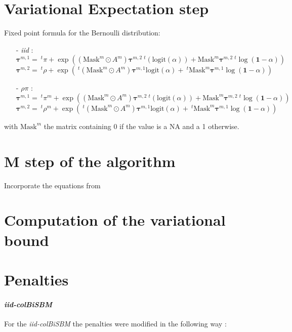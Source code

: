 \documentclass[12pt,a4paper]{report}
\begin{document}
\section{Variational Expectation step}
Fixed point formula for the Bernoulli distribution:
\begin{itemize}
    \item[-] \textit{iid} :
    \[ \bm{\tau}^{m,1} = ~^{t}\pi + \exp((\text{Mask}^{m} \odot A^{m})
        \bm{\tau}^{m,2} ~^{t}(\text{logit}(\alpha)) + \text{Mask}^{m} 
        \bm{\tau}^{m,2} ~^{t}\log(\bm{1} - \alpha)) \]
    \[ \bm{\tau}^{m,2} = ~^{t}\rho + \exp(~^{t}(\text{Mask}^{m} \odot A^{m}) 
    \bm{\tau}^{m,1} \text{logit}(\alpha) + ~^{t}\text{Mask}^{m} 
        \bm{\tau}^{m,1} \log(\bm{1} - \alpha)) \]
    \item[-] $\rho\pi$ :
        \[ \bm{\tau}^{m,1} = ~^{t}\pi^{m} + \exp((\text{Mask}^{m} \odot A^{m})
            \bm{\tau}^{m,2} ~^{t}(\text{logit}(\alpha)) + \text{Mask}^{m} 
            \bm{\tau}^{m,2} ~^{t}\log(\bm{1} - \alpha)) \]
        \[ \bm{\tau}^{m,2} = ~^{t}\rho^{m} + \exp(~^{t}(\text{Mask}^{m} \odot A^{m}) 
        \bm{\tau}^{m,1} \text{logit}(\alpha) + ~^{t}\text{Mask}^{m} 
            \bm{\tau}^{m,1} \log(\bm{1} - \alpha)) \]
\end{itemize}

with $\text{Mask}^{m}$ the matrix containing $0$ if the value is a NA and a 1
otherwise.

\section{M step of the algorithm}

Incorporate the equations from \parencite{chabert-liddellLearningCommonStructures2023}

\section{Computation of the variational bound}

\section{Penalties}

\paragraph*{\textit{iid-colBiSBM}}
For the \textit{iid-colBiSBM} the penalties were modified in the following way :
\end{document}
